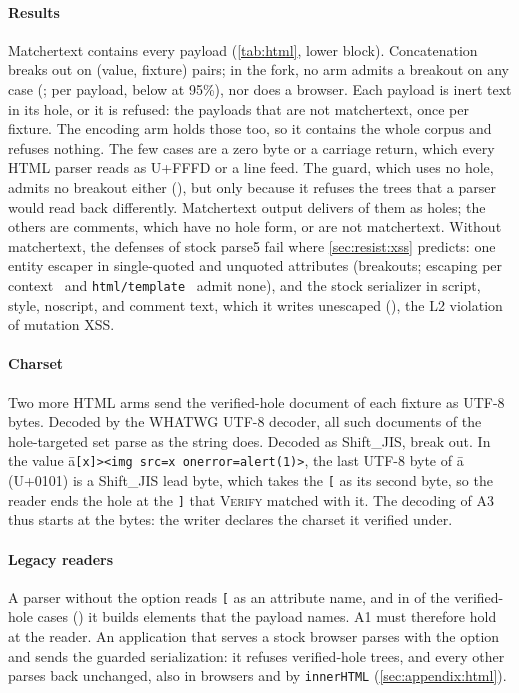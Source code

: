\paragraph{Results}
Matchertext contains every payload (\cref{tab:html}, lower block). Concatenation breaks out on \dataHtmlEffective (value, fixture) pairs; in the
fork, no arm admits a breakout on any case (\dataHtmlMtBreakout; per payload,
below \dataHtmlZeroBound at 95\%), nor does a browser. Each payload is inert
text in its hole,
or it is refused: the \dataHtmlNonMtPayloads payloads that are not matchertext, once
per fixture. The encoding arm holds those too, so it contains the whole corpus and
refuses nothing. The few  cases are a zero byte or a
carriage return, which every HTML parser reads as U+FFFD or a line feed.
The guard, which uses no hole, admits no breakout either
(\dataHtmlGuardedBreakout), but only because it refuses the \dataHtmlGuardedRefused
trees that a parser would read back differently. Matchertext output delivers
\dataHtmlGuardedRefusedMtInert of them as holes; the others are comments, which have
no hole form, or are not matchertext.
Without matchertext, the defenses of stock parse5 fail where
\cref{sec:resist:xss} predicts: one entity escaper in single-quoted and unquoted
attributes (\dataHtmlEscapeUncoveredBreakout breakouts; escaping per
context~\cite{owasp_xss} and \texttt{html/template}~\cite{samuel11csas} admit
none), and the stock serializer in
script, style, noscript, and comment text, which it writes unescaped
(\dataHtmlDomStockUncoveredBreakout), the L2 violation of mutation XSS.

\paragraph{Charset}
Two more HTML arms send the verified-hole document of each fixture as UTF-8 bytes.
Decoded by the WHATWG UTF-8 decoder, all \dataHtmlUtfEightRead such documents of
the hole-targeted set parse as the string does. Decoded as Shift\_JIS,
\dataHtmlSjisBreakout break out. In the value \={a}\verb|[x]><img src=x onerror=alert(1)>|,
the last UTF-8 byte of \={a} (U+0101) is a Shift\_JIS lead byte, which takes the
\verb|[| as its second byte, so the reader ends the hole at the \verb|]| that
\textsc{Verify} matched with it. The decoding of A3 thus starts at the bytes: the
writer declares the charset it verified under.

\paragraph{Legacy readers}
A parser without the option reads \verb|[| as an
attribute name, and in \dataHtmlLegacyElements of the \dataHtmlLegacyCases
verified-hole cases (\dataHtmlLegacyElementsShare) it builds elements that the
payload names. A1 must therefore hold at the reader. An application that serves a
stock browser parses with the option and sends the guarded serialization: it
refuses \dataHtmlTripRefused verified-hole trees, and every other parses back
unchanged, also in browsers and by \texttt{innerHTML} (\cref{sec:appendix:html}).

